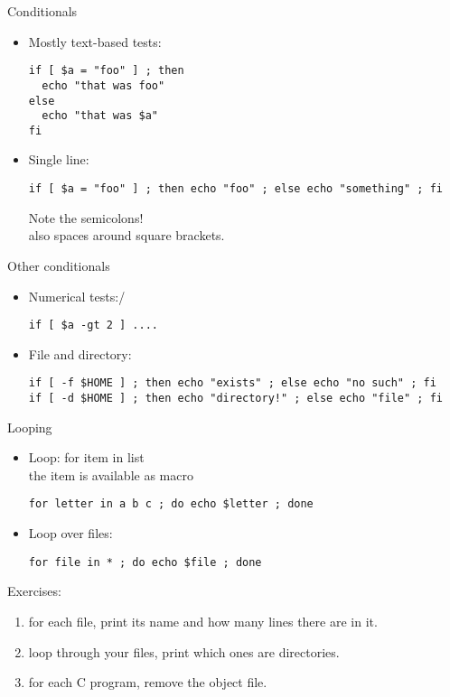 \documentclass[11pt,headernav]{beamer}
\begin{document}
\begin{numberedframe}{Conditionals}
  \label{sl-lnx:if}
\begin{itemize}
  \item Mostly text-based tests:
\begin{verbatim}
if [ $a = "foo" ] ; then
  echo "that was foo"
else
  echo "that was $a"
fi
\end{verbatim}
\item Single line:
{  \footnotesize
\begin{verbatim}
if [ $a = "foo" ] ; then echo "foo" ; else echo "something" ; fi
\end{verbatim}
}
Note the semicolons!\\
also spaces around square brackets.
  \end{itemize}
\end{numberedframe}

\begin{numberedframe}{Other conditionals}
  \begin{itemize}
\item Numerical tests:/
\begin{verbatim}
if [ $a -gt 2 ] ....
\end{verbatim}
\item File and directory:
{ \footnotesize
\begin{verbatim}
if [ -f $HOME ] ; then echo "exists" ; else echo "no such" ; fi
if [ -d $HOME ] ; then echo "directory!" ; else echo "file" ; fi
\end{verbatim}
}
  \end{itemize}
\end{numberedframe}

\begin{numberedframe}{Looping}
  \label{sl-lnx:for}
  \begin{itemize}
  \item Loop: for item in list\\
    the item is available as macro
\begin{verbatim}
for letter in a b c ; do echo $letter ; done
\end{verbatim}
\item Loop over files:
\begin{verbatim}
for file in * ; do echo $file ; done
\end{verbatim}
  \end{itemize}
  Exercises:
  \begin{enumerate}
  \item for each file, print its name and how many lines there are in it.
  \item loop through your files, print which ones are directories.
  \item for each C program, remove the object file.
  \end{enumerate}
\end{numberedframe}
\end{document}

